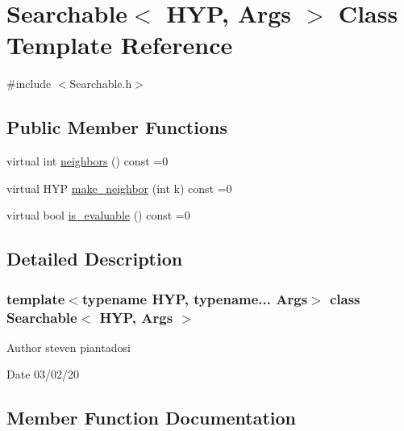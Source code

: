 \hypertarget{class_searchable}{}\section{Searchable$<$ H\+YP, Args $>$ Class Template Reference}
\label{class_searchable}


{\ttfamily \#include $<$Searchable.\+h$>$}

\subsection*{Public Member Functions}
\begin{DoxyCompactItemize}
\item 
virtual int \hyperlink{class_searchable_aec30063fcc9bed5d005f8318efa8492d}{neighbors} () const =0
\item 
virtual H\+YP \hyperlink{class_searchable_ad7fefacd3c9c2b66aa58c9d902f645cb}{make\+\_\+neighbor} (int k) const =0
\item 
virtual bool \hyperlink{class_searchable_a23786e95730117c3cc4b90e010494a1e}{is\+\_\+evaluable} () const =0
\end{DoxyCompactItemize}


\subsection{Detailed Description}
\subsubsection*{template$<$typename H\+YP, typename... Args$>$\newline
class Searchable$<$ H\+Y\+P, Args $>$}

\begin{DoxyAuthor}{Author}
steven piantadosi 
\end{DoxyAuthor}
\begin{DoxyDate}{Date}
03/02/20 
\end{DoxyDate}


\subsection{Member Function Documentation}
\mbox{\label{class_searchable_a23786e95730117c3cc4b90e010494a1e}} 

